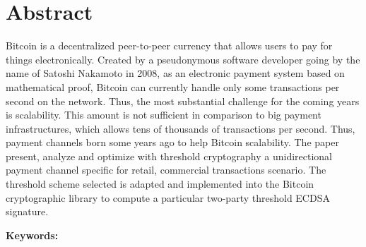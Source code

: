 \chapter*{Abstract}

Bitcoin is a decentralized peer-to-peer currency that allows users to pay for
things electronically. Created by a pseudonymous software developer going by the
name of Satoshi Nakamoto in 2008, as an electronic payment system based on
mathematical proof, Bitcoin can currently handle only some transactions per
second on the network. Thus, the most substantial challenge for the coming years
is scalability. This amount is not sufficient in comparison to big payment
infrastructures, which allows tens of thousands of transactions per second.
Thus, payment channels born some years ago to help Bitcoin scalability. The
paper present, analyze and optimize with threshold cryptography a unidirectional
payment channel specific for retail, commercial transactions scenario. The
threshold scheme selected is adapted and implemented into the Bitcoin
cryptographic library to compute a particular two-party threshold ECDSA
signature.

\vskip0.5cm
\noindent\textbf{Keywords:}
\Keywords
